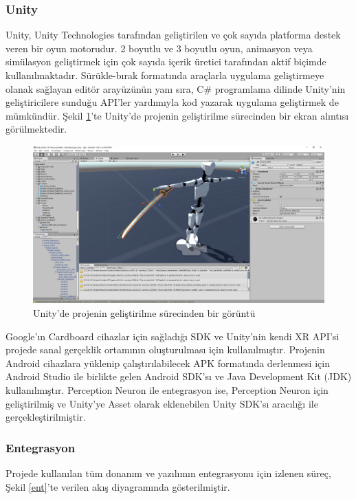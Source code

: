 \documentclass[a4paper, 12pt, titlepage]{article}
\begin{document}
\subsubsection{Unity}
Unity, Unity Technologies tarafından geliştirilen ve çok sayıda platforma destek veren bir oyun
motorudur. 2 boyutlu ve 3 boyutlu oyun, animasyon veya simülasyon geliştirmek için çok sayıda
içerik üretici tarafından aktif biçimde kullanılmaktadır. Sürükle-bırak formatında araçlarla
uygulama geliştirmeye olanak sağlayan editör arayüzünün yanı sıra, C\# programlama dilinde
Unity’nin geliştiricilere sunduğu API’ler yardımıyla kod yazarak uygulama geliştirmek de mümkündür.
\cite{unityg} Şekil \ref{u}'te Unity’de projenin geliştirilme sürecinden bir ekran alıntısı
görülmektedir.

\begin{figure}[ht!]
    \centering
        \includegraphics[width=5.8in]{images/u2}
    \caption{Unity'de projenin geliştirilme sürecinden bir görüntü}   
    \label{u}
\end{figure}

Google’ın Cardboard cihazlar için sağladığı SDK ve Unity’nin kendi XR API’si projede sanal
gerçeklik ortamının oluşturulması için kullanılmıştır. Projenin Android cihazlara yüklenip
çalıştırılabilecek APK formatında derlenmesi için Android Studio ile birlikte gelen Android SDK’sı
ve Java Development Kit (JDK) kullanılmıştır. Perception Neuron ile entegrasyon ise, Perception
Neuron için geliştirilmiş ve Unity’ye Asset olarak eklenebilen Unity SDK’sı aracılığı ile
gerçekleştirilmiştir.

\subsubsection{Entegrasyon}
Projede kullanılan tüm donanım ve yazılımın entegrasyonu için izlenen süreç, Şekil \ref{ent}’te
verilen akış diyagramında gösterilmiştir.
\end{document}
